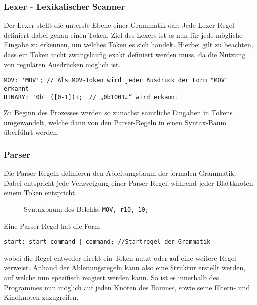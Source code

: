 \documentclass[paper=a4,fontsize=12pt,twocolumn]{scrreprt}
\begin{document}
\subsubsection{Lexer - Lexikalischer Scanner}
Der Lexer stellt die unterste Ebene einer Grammatik dar.
Jede Lexer-Regel definiert dabei genau einen Token.
Ziel des Lexers ist es nun für jede mögliche Eingabe zu erkennen, um welches Token es sich handelt.
Hierbei gilt zu beachten, dass ein Token nicht zwangsläufig exakt definiert werden muss, da die Nutzung von regulären Ausdrücken möglich ist.
\begin{lstlisting}
MOV: 'MOV'; // Als MOV-Token wird jeder Ausdruck der Form "MOV" erkannt
BINARY: '0b' ([0-1])+;  // „0b1001…“ wird erkannt
\end{lstlisting}
Zu Beginn des Prozesses werden so zunächst sämtliche Eingaben in Tokens umgewandelt, welche dann von den Parser-Regeln in einen Syntax-Baum überführt werden.

\subsubsection{Parser}
Die Parser-Regeln definieren den Ableitungsbaum der formalen Grammatik.
Dabei entspricht jede Verzweigung einer Parser-Regel, während jeder Blattknoten einem Token entspricht.

\begin{figure}[h]
\centering
\caption{Syntaxbaum des Befehls: \texttt{MOV, r10, 10;}}
\end{figure}

Eine Parser-Regel hat die Form
\begin{lstlisting}
start: start command | command; //Startregel der Grammatik
\end{lstlisting}
wobei die Regel entweder direkt ein Token nutzt oder auf eine weitere Regel verweist.
Anhand der Ableitungsregeln kann also eine Struktur erstellt werden, auf welche nun spezifisch reagiert werden kann.
So ist es innerhalb des Programmes nun möglich auf jeden Knoten des Baumes, sowie seine Eltern- und Kindknoten zuzugreifen.
\end{document}
